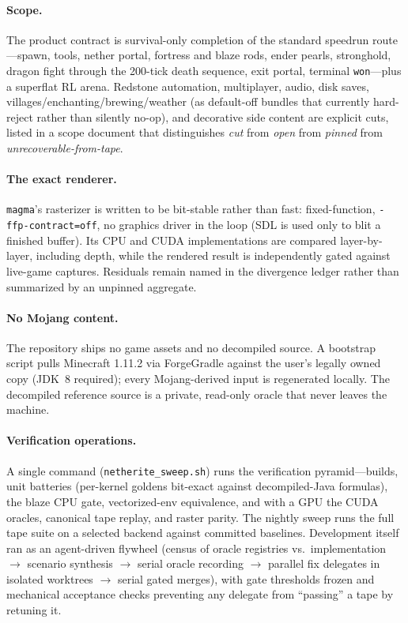 \documentclass[11pt]{article}
\begin{document}
\paragraph{Scope.} The product contract is survival-only completion of the standard speedrun route---spawn, tools, nether portal, fortress and blaze rods, ender pearls, stronghold, dragon fight through the 200-tick death sequence, exit portal, terminal \texttt{won}---plus a superflat RL arena. Redstone automation, multiplayer, audio, disk saves, villages/enchanting/brewing/weather (as default-off bundles that currently hard-reject rather than silently no-op), and decorative side content are explicit cuts, listed in a scope document that distinguishes \emph{cut} from \emph{open} from \emph{pinned} from \emph{unrecoverable-from-tape}.

\paragraph{The exact renderer.} \texttt{magma}'s rasterizer is written to be bit-stable rather than fast: fixed-function, \texttt{-ffp-contract=off}, no graphics driver in the loop (SDL is used only to blit a finished buffer). Its CPU and CUDA implementations are compared layer-by-layer, including depth, while the rendered result is independently gated against live-game captures. Residuals remain named in the divergence ledger rather than summarized by an unpinned aggregate.

\paragraph{No Mojang content.} The repository ships no game assets and no decompiled source. A bootstrap script pulls Minecraft 1.11.2 via ForgeGradle against the user's legally owned copy (JDK~8 required); every Mojang-derived input is regenerated locally. The decompiled reference source is a private, read-only oracle that never leaves the machine.

\paragraph{Verification operations.} A single command (\texttt{netherite\_sweep.sh}) runs the verification pyramid---builds, unit batteries (per-kernel goldens bit-exact against decompiled-Java formulas), the blaze CPU gate, vectorized-env equivalence, and with a GPU the CUDA oracles, canonical tape replay, and raster parity. The nightly sweep runs the full tape suite on a selected backend against committed baselines. Development itself ran as an agent-driven flywheel (census of oracle registries vs.\ implementation $\rightarrow$ scenario synthesis $\rightarrow$ serial oracle recording $\rightarrow$ parallel fix delegates in isolated worktrees $\rightarrow$ serial gated merges), with gate thresholds frozen and mechanical acceptance checks preventing any delegate from ``passing'' a tape by retuning it.
\end{document}
